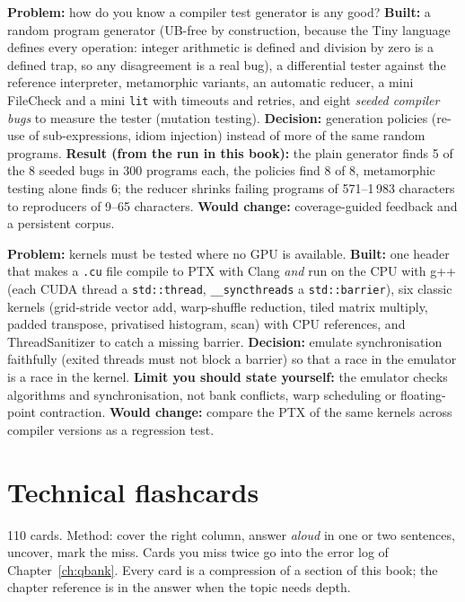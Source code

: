 \documentclass[10pt,a4paper,openany,oneside]{report}
\newcommand{\prio}[1]{\texorpdfstring{\ifcase#1\or{\color{gold}\ding{72}}\or{\color{gold}\ding{72}\ding{72}}\or{\color{gold}\ding{72}\ding{72}\ding{72}}\fi}{}}
\begin{document}
\begin{exbox}
\textbf{Problem:} how do you know a compiler test generator is any good? \textbf{Built:} a random program generator (UB-free by construction, because the Tiny language defines every operation: integer arithmetic is defined and division by zero is a defined trap, so any disagreement is a real bug), a differential tester against the reference interpreter, metamorphic variants, an automatic reducer, a mini FileCheck and a mini \texttt{lit} with timeouts and retries, and eight \emph{seeded compiler bugs} to measure the tester (mutation testing). \textbf{Decision:} generation policies (re-use of sub-expressions, idiom injection) instead of more of the same random programs. \textbf{Result (from the run in this book):} the plain generator finds 5 of the 8 seeded bugs in 300 programs each, the policies find 8 of 8, metamorphic testing alone finds 6; the reducer shrinks failing programs of 571--1\,983 characters to reproducers of 9--65 characters. \textbf{Would change:} coverage-guided feedback and a persistent corpus.
\end{exbox}
\begin{exbox}
\textbf{Problem:} kernels must be tested where no GPU is available. \textbf{Built:} one header that makes a \texttt{.cu} file compile to PTX with Clang \emph{and} run on the CPU with g++ (each CUDA thread a \texttt{std::thread}, \texttt{\_\_syncthreads} a \texttt{std::barrier}), six classic kernels (grid-stride vector add, warp-shuffle reduction, tiled matrix multiply, padded transpose, privatised histogram, scan) with CPU references, and ThreadSanitizer to catch a missing barrier. \textbf{Decision:} emulate synchronisation faithfully (exited threads must not block a barrier) so that a race in the emulator is a race in the kernel. \textbf{Limit you should state yourself:} the emulator checks algorithms and synchronisation, not bank conflicts, warp scheduling or floating-point contraction. \textbf{Would change:} compare the PTX of the same kernels across compiler versions as a regression test.
\end{exbox}


\section{Technical flashcards \prio{2}}\label{sec:cards}
110 cards. Method: cover the right column, answer \emph{aloud} in one or two sentences, uncover, mark the miss. Cards you miss twice go into the error log of Chapter~\ref{ch:qbank}. Every card is a compression of a section of this book; the chapter reference is in the answer when the topic needs depth.
\end{document}
